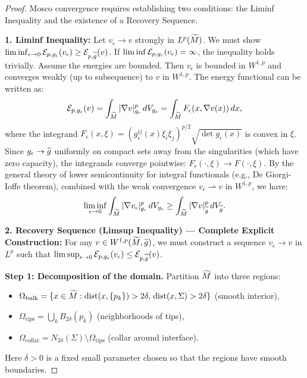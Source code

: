 \begin{proof}
Mosco convergence requires establishing two conditions: the Liminf Inequality and the existence of a Recovery Sequence.

\textbf{1. Liminf Inequality:}
Let $v_\epsilon \to v$ strongly in $L^p(\widetilde{M})$. We must show $\liminf_{\epsilon \to 0} \mathcal{E}_{p,g_{\epsilon}}(v_\epsilon) \ge \mathcal{E}_{p,\widetilde{g}}(v)$.
If $\liminf \mathcal{E}_{p,g_{\epsilon}}(v_\epsilon) = \infty$, the inequality holds trivially. Assume the energies are bounded. Then $v_\epsilon$ is bounded in $W^{1,p}$ and converges weakly (up to subsequence) to $v$ in $W^{1,p}$.
The energy functional can be written as:
\[ \mathcal{E}_{p,g_{\epsilon}}(v) = \int_{\widetilde{M}} |\nabla v|^p_{g_{\epsilon}} \, dV_{g_{\epsilon}} = \int_{\widetilde{M}} F_\epsilon(x, \nabla v(x)) \, dx, \]
where the integrand $F_\epsilon(x, \xi) = (g_\epsilon^{ij}(x) \xi_i \xi_j)^{p/2} \sqrt{\det g_\epsilon(x)}$ is convex in $\xi$.
Since $g_{\epsilon} \to \widetilde{g}$ uniformly on compact sets away from the singularities (which have zero capacity), the integrands converge pointwise: $F_\epsilon(\cdot, \xi) \to F(\cdot, \xi)$.
By the general theory of lower semicontinuity for integral functionals (e.g., De Giorgi-Ioffe theorem), combined with the weak convergence $v_\epsilon \rightharpoonup v$ in $W^{1,p}$, we have:
\[ \liminf_{\epsilon \to 0} \int_{\widetilde{M}} |\nabla v_\epsilon|^p_{g_{\epsilon}} \, dV_{g_{\epsilon}} \ge \int_{\widetilde{M}} |\nabla v|^p_{\widetilde{g}} \, dV_{\widetilde{g}}. \]

\textbf{2. Recovery Sequence (Limsup Inequality) --- Complete Explicit Construction:}
For any $v \in W^{1,p}(\widetilde{M}, \widetilde{g})$, we must construct a sequence $v_\epsilon \to v$ in $L^p$ such that $\limsup_{\epsilon \to 0} \mathcal{E}_{p,g_{\epsilon}}(v_\epsilon) \le \mathcal{E}_{p,\widetilde{g}}(v)$.

\textbf{Step 1: Decomposition of the domain.}
Partition $\widetilde{M}$ into three regions:
\begin{itemize}
    \item $\Omega_{\text{bulk}} = \{x \in \widetilde{M} : \mathrm{dist}(x, \{p_k\}) > 2\delta, \, \mathrm{dist}(x, \Sigma) > 2\delta\}$ (smooth interior),
    \item $\Omega_{\text{tips}} = \bigcup_k B_{2\delta}(p_k)$ (neighborhoods of tips),
    \item $\Omega_{\text{collar}} = N_{2\delta}(\Sigma) \setminus \Omega_{\text{tips}}$ (collar around interface).
\end{itemize}
Here $\delta > 0$ is a fixed small parameter chosen so that the regions have smooth boundaries.


\end{proof}
